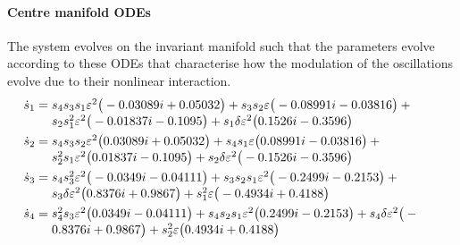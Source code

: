 \paragraph{Centre manifold ODEs} 
The system evolves on the invariant manifold such
that the parameters evolve according to these ODEs that characterise how the modulation of the oscillations evolve due to their nonlinear interaction.
\begin{align*}&
\dot s_{1}=\ParMath{s_{4} s_{3} s_{1} \eps^{2} \big(-0.03089 i+0.05032\big)+s
_{3} s_{2} \eps \big(-0.08991 i-0.03816\big)+s_{2} s_{1}^{2} \eps^{2
} \big(-0.01837 i-0.1095\big)+s_{1} \delta  \eps^{2} \big(0.1526 i
-0.3596\big)}
\\&
\dot s_{2}=\ParMath{s_{4} s_{3} s_{2} \eps^{2} \big(0.03089 i+0.05032\big)+s_
{4} s_{1} \eps \big(0.08991 i-0.03816\big)+s_{2}^{2} s_{1} \eps^{2} 
\big(0.01837 i-0.1095\big)+s_{2} \delta  \eps^{2} \big(-0.1526 i-
0.3596\big)}
\\&
\dot s_{3}=\ParMath{s_{4} s_{3}^{2} \eps^{2} \big(-0.0349 i-0.04111\big)+s_{3
} s_{2} s_{1} \eps^{2} \big(-0.2499 i-0.2153\big)+s_{3} \delta  \eps
^{2} \big(0.8376 i+0.9867\big)+s_{1}^{2} \eps \big(-0.4934 i+
0.4188\big)}
\\&
\dot s_{4}=\ParMath{s_{4}^{2} s_{3} \eps^{2} \big(0.0349 i-0.04111\big)+s_{4}
 s_{2} s_{1} \eps^{2} \big(0.2499 i-0.2153\big)+s_{4} \delta  \eps^{
2} \big(-0.8376 i+0.9867\big)+s_{2}^{2} \eps \big(0.4934 i+
0.4188\big)}
\end{align*}


